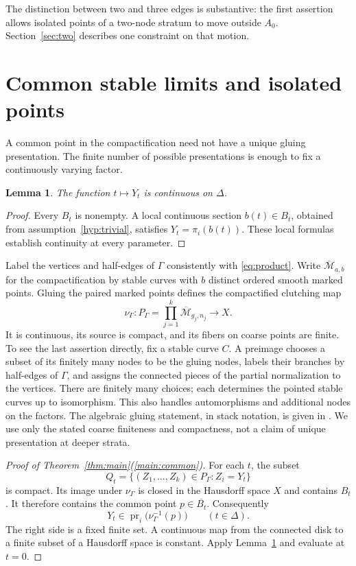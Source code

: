 \documentclass[11pt]{article}
\newcommand{\Mb}{\overline{\mathcal M}}
\newcommand{\cl}[1]{\overline{#1}}
\DeclareMathOperator{\pr}{pr}
\newtheorem{lemma}[theorem]{Lemma}
\theoremstyle{definition}
\theoremstyle{remark}
\begin{document}
The distinction between two and three edges is substantive: the first assertion allows isolated points of a two-node stratum to move outside $A_0$. Section~\ref{sec:two} describes one constraint on that motion.

\section{Common stable limits and isolated points}\label{sec:common}

A common point in the compactification need not have a unique gluing presentation. The finite number of possible presentations is enough to fix a continuously varying factor.

\begin{lemma}\label{lem:continuous}
The function $t\mapsto Y_t$ is continuous on $\Delta$.
\end{lemma}

\begin{proof}
Every $B_t$ is nonempty. A local continuous section $b(t)\in B_t$, obtained from assumption~\ref{hyp:trivial}, satisfies $Y_t=\pi_i(b(t))$. These local formulas establish continuity at every parameter.
\end{proof}

Label the vertices and half-edges of $\Gamma$ consistently with \eqref{eq:product}. Write $\Mb_{a,b}$ for the compactification by stable curves with $b$ distinct ordered smooth marked points. Gluing the paired marked points defines the compactified clutching map
\begin{equation}\label{eq:clutch}
 \nu_\Gamma:P_\Gamma=\prod_{j=1}^k\Mb_{g_j,n_j}\longrightarrow X.
\end{equation}
It is continuous, its source is compact, and its fibers on coarse points are finite. To see the last assertion directly, fix a stable curve $C$. A preimage chooses a subset of its finitely many nodes to be the gluing nodes, labels their branches by half-edges of $\Gamma$, and assigns the connected pieces of the partial normalization to the vertices. There are finitely many choices; each determines the pointed stable curves up to isomorphism. This also handles automorphisms and additional nodes on the factors. The algebraic gluing statement, in stack notation, is given in \cite[Definition~4.1, p.~175, and Proposition~4.4, p.~176]{EF}. We use only the stated coarse finiteness and compactness, not a claim of unique presentation at deeper strata.

\begin{proof}[Proof of Theorem~\ref{thm:main}(\ref{main:common})]
For each $t$, the subset
\[
 Q_t=\{(Z_1,\ldots,Z_k)\in P_\Gamma:Z_i=Y_t\}
\]
is compact. Its image under $\nu_\Gamma$ is closed in the Hausdorff space $X$ and contains $B_t$. It therefore contains the common point $p\in\cl{B_t}$. Consequently
\begin{equation}\label{eq:finite-values}
 Y_t\in\pr_i\bigl(\nu_\Gamma^{-1}(p)\bigr)\qquad(t\in\Delta).
\end{equation}
The right side is a fixed finite set. A continuous map from the connected disk to a finite subset of a Hausdorff space is constant. Apply Lemma~\ref{lem:continuous} and evaluate at $t=0$.
\end{proof}
\end{document}
